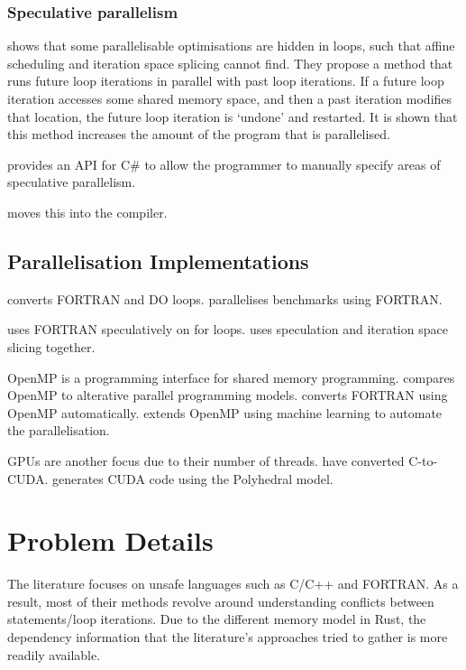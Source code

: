 \documentclass[conference]{IEEEtran}
\begin{document}
\subsubsection{Speculative parallelism}
\textcite{Zhong2008} shows that some parallelisable optimisations are hidden in loops, such that affine scheduling and iteration space splicing cannot find. They propose a method that runs future loop iterations in parallel with past loop iterations. If a future loop iteration accesses some shared memory space, and then a past iteration modifies that location, the future loop iteration is `undone' and restarted. It is shown that this method increases the amount of the program that is parallelised.

\textcite{Prabhu2010} provides an API for C\# to allow the programmer to manually specify areas of speculative parallelism.

\textcite{Yiapanis2015} moves this into the compiler.

\subsection{Parallelisation Implementations}
\textcite{DHollander1998} converts FORTRAN and DO loops.
\textcite{Eigenmann1998} parallelises benchmarks using FORTRAN.

\textcite{Rauchwerger1999} uses FORTRAN speculatively on for loops.
\textcite{Quinones2005} uses speculation and iteration space slicing together.

OpenMP is a programming interface for shared memory programming.
\textcite{Dagum1998} compares OpenMP to alterative parallel programming models.
\textcite{Kim2000} converts FORTRAN using OpenMP automatically.
\textcite{Lam2011} extends OpenMP using machine learning to automate the parallelisation.

GPUs are another focus due to their number of threads.
\textcite{Baskaran2010} have converted C-to-CUDA.
\textcite{Verdoolaege2013} generates CUDA code using the Polyhedral model.

\section{Problem Details}
\label{sec:problem-details}

The literature focuses on unsafe languages such as C/C++ and FORTRAN. As a result, most of their methods revolve around understanding conflicts between statements/loop iterations. Due to the different memory model in Rust, the dependency information that the literature's approaches tried to gather is more readily available.
\end{document}
